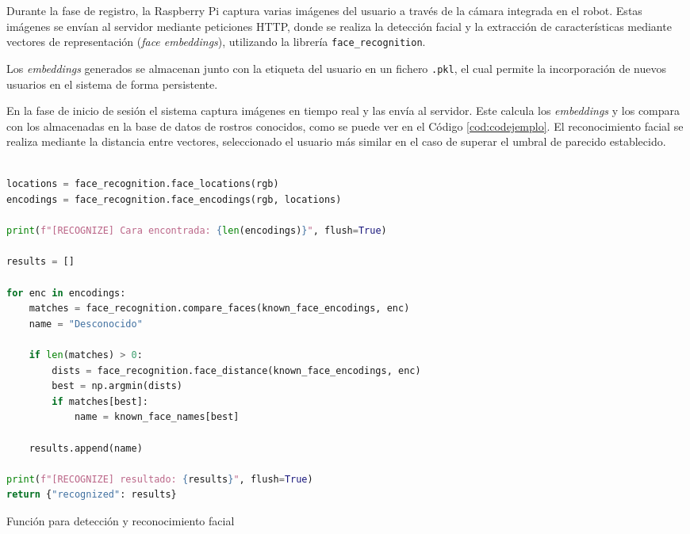 \vspace{0.2cm}

Durante la fase de registro, la Raspberry Pi captura varias imágenes del usuario a través de la cámara integrada en el robot. Estas imágenes se envían al servidor mediante peticiones HTTP, donde se realiza la detección facial y la extracción de características mediante vectores de representación (\textit{face embeddings}), utilizando la librería \verb|face_recognition|.

Los \textit{embeddings} generados se almacenan junto con la etiqueta del usuario en un fichero \texttt{.pkl}, el cual permite la incorporación  de nuevos usuarios en el sistema de forma persistente.

\vspace{0.2cm}

En la fase de inicio de sesión el sistema captura imágenes en tiempo real y las envía al servidor. Este calcula los \textit{embeddings} y los compara con los almacenadas en la base de datos de rostros conocidos, como se puede ver en el Código \ref{cod:codejemplo}. El reconocimiento facial se realiza mediante la distancia entre vectores, seleccionado el usuario más similar en el caso de superar el umbral de parecido establecido.


\begin{code}[h]
\begin{lstlisting}[language=python]

locations = face_recognition.face_locations(rgb)
encodings = face_recognition.face_encodings(rgb, locations)

print(f"[RECOGNIZE] Cara encontrada: {len(encodings)}", flush=True)

results = []

for enc in encodings:
    matches = face_recognition.compare_faces(known_face_encodings, enc)
    name = "Desconocido"

    if len(matches) > 0:
        dists = face_recognition.face_distance(known_face_encodings, enc)
        best = np.argmin(dists)
        if matches[best]:
            name = known_face_names[best]

    results.append(name)

print(f"[RECOGNIZE] resultado: {results}", flush=True)
return {"recognized": results}

\end{lstlisting}
\caption[Función para detección y reconocimiento facial]{Función para detección y reconocimiento facial}
\label{cod:codejemplo}
\end{code}

